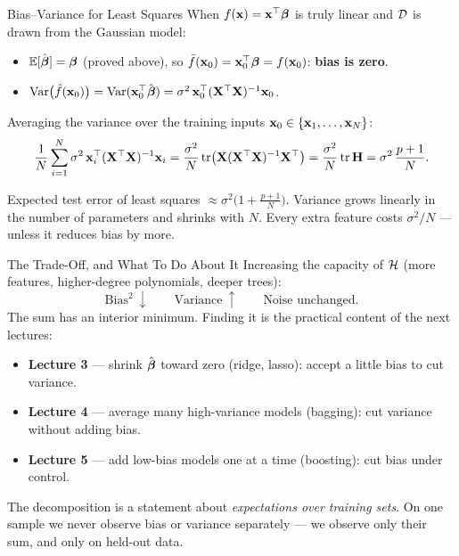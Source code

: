\documentclass[11pt,aspectratio=169]{beamer}
\begin{document}
\begin{frame}{Bias--Variance for Least Squares}\footnotesize
When $f(\mathbf{x})=\mathbf{x}^{\top}\boldsymbol{\beta}$ is truly linear and $\mathcal{D}$ is drawn from the Gaussian model:
\begin{itemize}
  \item $\mathbb{E}[\hat{\boldsymbol{\beta}}]=\boldsymbol{\beta}$ (proved above), so $\bar f(\mathbf{x}_0)=\mathbf{x}_0^{\top}\boldsymbol{\beta}=f(\mathbf{x}_0)$: \textbf{bias is zero}.
  \item $\operatorname{Var}\bigl(\hat f(\mathbf{x}_0)\bigr)=\operatorname{Var}(\mathbf{x}_0^{\top}\hat{\boldsymbol{\beta}})=\sigma^2\,\mathbf{x}_0^{\top}(\mathbf{X}^{\top}\mathbf{X})^{-1}\mathbf{x}_0$.
\end{itemize}
Averaging the variance over the training inputs $\mathbf{x}_0\in\{\mathbf{x}_1,\dots,\mathbf{x}_N\}$:
\[
\frac1N\sum_{i=1}^N\sigma^2\,\mathbf{x}_i^{\top}(\mathbf{X}^{\top}\mathbf{X})^{-1}\mathbf{x}_i
=\frac{\sigma^2}{N}\operatorname{tr}\bigl(\mathbf{X}(\mathbf{X}^{\top}\mathbf{X})^{-1}\mathbf{X}^{\top}\bigr)
=\frac{\sigma^2}{N}\operatorname{tr}\mathbf{H}=\sigma^2\,\frac{p+1}{N}.
\]
\begin{keypoint}
Expected test error of least squares $\approx\sigma^2\bigl(1+\tfrac{p+1}{N}\bigr)$. Variance grows
linearly in the number of parameters and shrinks with $N$. Every extra feature costs $\sigma^2/N$ ---
unless it reduces bias by more.
\end{keypoint}
\end{frame}

\begin{frame}{The Trade-Off, and What To Do About It}
Increasing the capacity of $\mathcal{H}$ (more features, higher-degree polynomials, deeper trees):
\[
\text{Bias}^2\ \downarrow\qquad\text{Variance}\ \uparrow\qquad\text{Noise unchanged.}
\]
The sum has an interior minimum. Finding it is the practical content of the next lectures:
\begin{itemize}
  \item \textbf{Lecture 3} --- shrink $\hat{\boldsymbol{\beta}}$ toward zero (ridge, lasso): accept a little bias to cut variance.
  \item \textbf{Lecture 4} --- average many high-variance models (bagging): cut variance without adding bias.
  \item \textbf{Lecture 5} --- add low-bias models one at a time (boosting): cut bias under control.
\end{itemize}
\begin{caution}
The decomposition is a statement about \emph{expectations over training sets}. On one sample we never
observe bias or variance separately --- we observe only their sum, and only on held-out data.
\end{caution}
\end{frame}
\end{document}
